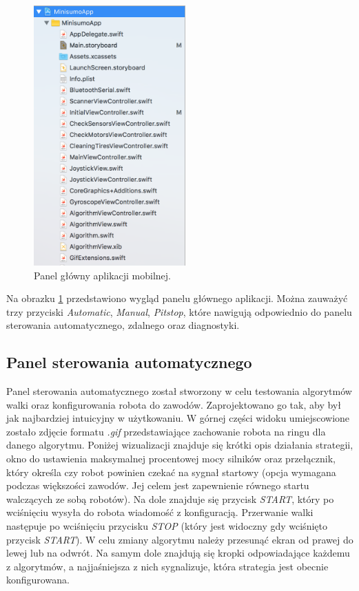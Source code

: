 \begin{figure}[H]
	\centering
		\includegraphics[width=0.75\linewidth, height=10cm, keepaspectratio]{pic05/structure.png}
	\caption{Panel główny aplikacji mobilnej.}
	\label{fig:mainview}	
\end{figure}

Na obrazku \ref{fig:mainview} przedstawiono wygląd panelu głównego aplikacji. Można zauważyć trzy przyciski \textit{Automatic}, \textit{Manual}, \textit{Pitstop}, które nawigują odpowiednio do panelu sterowania automatycznego, zdalnego oraz diagnostyki. 

\subsection{Panel sterowania automatycznego}
Panel sterowania automatycznego został stworzony w celu testowania algorytmów walki oraz konfigurowania robota do zawodów. Zaprojektowano go tak, aby był jak najbardziej intuicyjny w użytkowaniu. W górnej części widoku umiejscowione zostało zdjęcie formatu \textit{.gif} przedstawiające zachowanie robota na ringu dla danego algorytmu. Poniżej wizualizacji znajduje się krótki opis działania strategii, okno do ustawienia maksymalnej procentowej mocy silników oraz przełącznik, który określa czy robot powinien czekać na sygnał startowy (opcja wymagana podczas większości zawodów. Jej celem jest zapewnienie równego startu walczących ze sobą robotów). Na dole znajduje się przycisk \textit{START}, który po wciśnięciu wysyła do robota wiadomość z konfiguracją. Przerwanie walki następuje po wciśnięciu przycisku \textit{STOP} (który jest widoczny gdy wciśnięto przycisk \textit{START}).  W celu zmiany algorytmu należy przesunąć ekran od prawej do lewej lub na odwrót. Na samym dole znajdują się kropki odpowiadające każdemu z algorytmów, a najjaśniejsza z nich sygnalizuje, która strategia jest obecnie konfigurowana.

